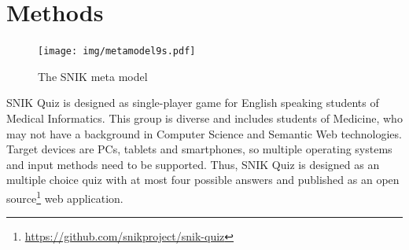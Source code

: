 \documentclass{IOS-Book-Article}     %
\begin{document}

\section{Methods}
\begin{figure}
\caption{The SNIK meta model}
\label{fig:metamodel}
\centering
\texttt{[image: img/metamodel9s.pdf]}
\end{figure}
SNIK Quiz is designed as single-player game for English speaking students of Medical Informatics.
This group is diverse and includes students of Medicine, who may not have a background in Computer Science and Semantic Web technologies.
Target devices are PCs, tablets and smartphones, so multiple operating systems and input methods need to be supported.
Thus, SNIK Quiz is designed as an multiple choice quiz with at most four possible answers and published as an open source\footnote{\url{https://github.com/snikproject/snik-quiz}} web application.
\end{document}

